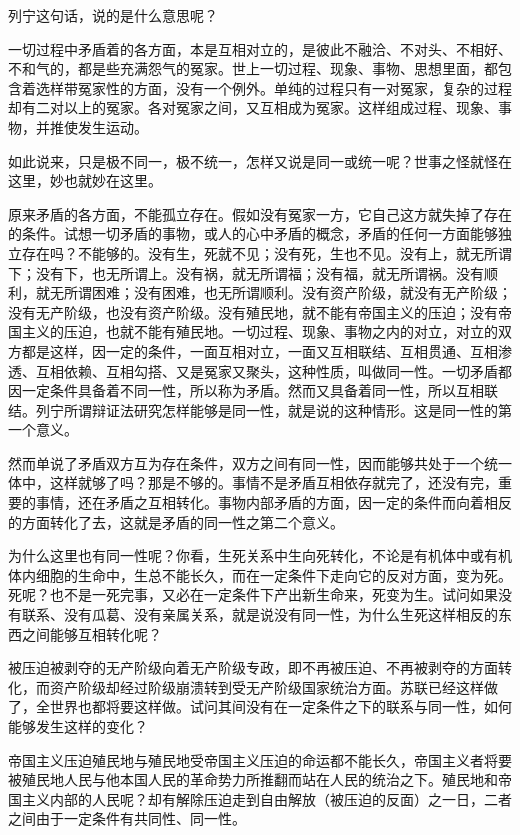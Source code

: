 \documentclass[UTF8, 12pt, a4paper]{ctexrep}
\begin{document}
列宁这句话，说的是什么意思呢？

一切过程中矛盾着的各方面，本是互相对立的，是彼此不融洽、不对头、不相好、不和气的，都是些充满怨气的冤家。世上一切过程、现象、事物、思想里面，都包含着选样带冤家性的方面，没有一个例外。单纯的过程只有一对冤家，复杂的过程却有二对以上的冤家。各对冤家之间，又互相成为冤家。这样组成过程、现象、事物，并推使发生运动。

如此说来，只是极不同一，极不统一，怎样又说是同一或统一呢？世事之怪就怪在这里，妙也就妙在这里。

原来矛盾的各方面，不能孤立存在。假如没有冤家一方，它自己这方就失掉了存在的条件。试想一切矛盾的事物，或人的心中矛盾的概念，矛盾的任何一方面能够独立存在吗？不能够的。没有生，死就不见；没有死，生也不见。没有上，就无所谓下；没有下，也无所谓上。没有祸，就无所谓福；没有福，就无所谓祸。没有顺利，就无所谓困难；没有困难，也无所谓顺利。没有资产阶级，就没有无产阶级；没有无产阶级，也没有资产阶级。没有殖民地，就不能有帝国主义的压迫；没有帝国主义的压迫，也就不能有殖民地。一切过程、现象、事物之内的对立，对立的双方都是这样，因一定的条件，一面互相对立，一面又互相联结、互相贯通、互相渗透、互相依赖、互相勾搭、又是冤家又聚头，这种性质，叫做同一性。一切矛盾都因一定条件具备着不同一性，所以称为矛盾。然而又具备着同一性，所以互相联结。列宁所谓辩证法研究怎样能够是同一性，就是说的这种情形。这是同一性的第一个意义。

然而单说了矛盾双方互为存在条件，双方之间有同一性，因而能够共处于一个统一体中，这样就够了吗？那是不够的。事情不是矛盾互相依存就完了，还没有完，重要的事情，还在矛盾之互相转化。事物内部矛盾的方面，因一定的条件而向着相反的方面转化了去，这就是矛盾的同一性之第二个意义。

为什么这里也有同一性呢？你看，生死关系中生向死转化，不论是有机体中或有机体内细胞的生命中，生总不能长久，而在一定条件下走向它的反对方面，变为死。死呢？也不是一死完事，又必在一定条件下产出新生命来，死变为生。试问如果没有联系、没有瓜葛、没有亲属关系，就是说没有同一性，为什么生死这样相反的东西之间能够互相转化呢？

被压迫被剥夺的无产阶级向着无产阶级专政，即不再被压迫、不再被剥夺的方面转化，而资产阶级却经过阶级崩溃转到受无产阶级国家统治方面。苏联已经这样做了，全世界也都将要这样做。试问其间没有在一定条件之下的联系与同一性，如何能够发生这样的变化？

帝国主义压迫殖民地与殖民地受帝国主义压迫的命运都不能长久，帝国主义者将要被殖民地人民与他本国人民的革命势力所推翻而站在人民的统治之下。殖民地和帝国主义内部的人民呢？却有解除压迫走到自由解放（被压迫的反面）之一日，二者之间由于一定条件有共同性、同一性。
\end{document}
